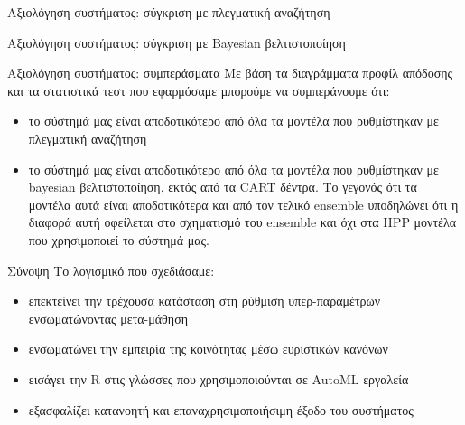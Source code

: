 \documentclass{beamer}
\begin{document}
  \begin{frame}{Αξιολόγηση συστήματος: σύγκριση με πλεγματική αναζήτηση} 
  	\begin{figure}[!htb]
  		\scalebox{0.5}{
  			}
  	\end{figure}
  \end{frame}
    \begin{frame}{Αξιολόγηση συστήματος: σύγκριση με Bayesian βελτιστοποίηση} 
    	\begin{figure}[!htb]
    		\scalebox{0.5}{
    			}
    	\end{figure}
    \end{frame}
    \begin{frame}{Αξιολόγηση συστήματος: συμπεράσματα}
    	Με βάση τα διαγράμματα προφίλ απόδοσης και τα στατιστικά τεστ που εφαρμόσαμε μπορούμε να συμπεράνουμε ότι:
    	\begin{itemize}
    		\item το σύστημά μας είναι αποδοτικότερο από όλα τα μοντέλα που ρυθμίστηκαν με πλεγματική αναζήτηση
    		\item το σύστημά μας είναι αποδοτικότερο από όλα τα μοντέλα που ρυθμίστηκαν με bayesian βελτιστοποίηση, εκτός από τα CART δέντρα. Το γεγονός ότι τα μοντέλα αυτά είναι αποδοτικότερα και από τον τελικό ensemble υποδηλώνει ότι η διαφορά αυτή οφείλεται στο σχηματισμό του ensemble και όχι στα HPP μοντέλα που χρησιμοποιεί το σύστημά μας.
    	\end{itemize}
    \end{frame}
  \begin{frame}{Σύνοψη} 
   Το λογισμικό που σχεδιάσαμε: 
  	\begin{itemize}
  		\item επεκτείνει την τρέχουσα κατάσταση στη ρύθμιση υπερ-παραμέτρων ενσωματώνοντας μετα-μάθηση
  		\item ενσωματώνει την εμπειρία της κοινότητας μέσω ευριστικών κανόνων
  		\item εισάγει την R στις γλώσσες που χρησιμοποιούνται σε AutoML εργαλεία
  		\item εξασφαλίζει κατανοητή και επαναχρησιμοποιήσιμη έξοδο του συστήματος 
  	\end{itemize}
  \end{frame}
\end{document}
